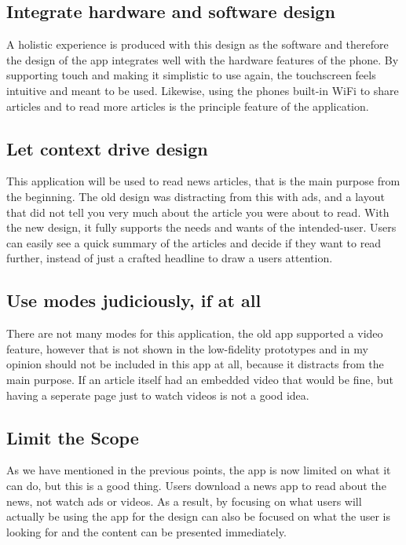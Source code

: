 \documentclass[a4paper, 11pt]{article}
\begin{document}
\subsection*{Integrate hardware and software design}
A holistic experience is produced with this design as the software and therefore the design of the app integrates well with the hardware features of the phone. By supporting touch and making it simplistic to use again, the touchscreen feels intuitive and meant to be used.  Likewise, using the phones built-in WiFi to share articles and to read more articles is the principle feature of the application.

\subsection*{Let context drive design}
This application will be used to read news articles, that is the main purpose from the beginning.  The old design was distracting from this with ads, and a layout that did not tell you very much about the article you were about to read.  With the new design, it fully supports the needs and wants of the intended-user.  Users can easily see a quick summary of the articles and decide if they want to read further, instead of just a crafted headline to draw a users attention. 

\subsection*{Use modes judiciously, if at all}
There are not many modes for this application, the old app supported a video feature, however that is not shown in the low-fidelity prototypes and in my opinion should not be included in this app at all, because it distracts from the main purpose.  If an article itself had an embedded video that would be fine, but having a seperate page just to watch videos is not a good idea.

\subsection*{Limit the Scope}
As we have mentioned in the previous points, the app is now limited on what it can do, but this is a good thing.  Users download a news app to read about the news, not watch ads or videos.  As a result, by focusing on what users will actually be using the app for the design can also be focused on what the user is looking for and the content can be presented immediately.
\end{document}
